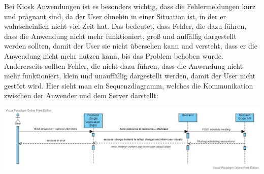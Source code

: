 Bei Kiosk Anwendungen ist es besonders wichtig, dass die Fehlermeldungen kurz und prägnant sind, da der User ohnehin in einer Situation ist, in der er wahrscheinlich nicht viel Zeit hat.
Das bedeutet, dass Fehler, die dazu führen, dass die Anwendung nicht mehr funktioniert, groß und auffällig dargestellt werden sollten, damit der User sie nicht übersehen kann und versteht, dass er die Anwendung nicht mehr nutzen kann, bis das Problem behoben wurde.
Andererseits sollten Fehler, die nicht dazu führen, dass die Anwendung nicht mehr funktioniert, klein und unauffällig dargestellt werden, damit der User nicht gestört wird.
\newline
\newline
Hier sieht man ein Sequenzdiagramm, welches die Kommunikation zwischen der Anwender und dem Server darstellt:
\newline
\newline
\par\vspace{0.5cm}
\centering
\includegraphics[width=\textwidth]{Bilder/Objektorientiertes Design/Sequence diagram for ressource booking (3)}
\par\vspace{0.5cm}
\raggedright
\newline
\newline
